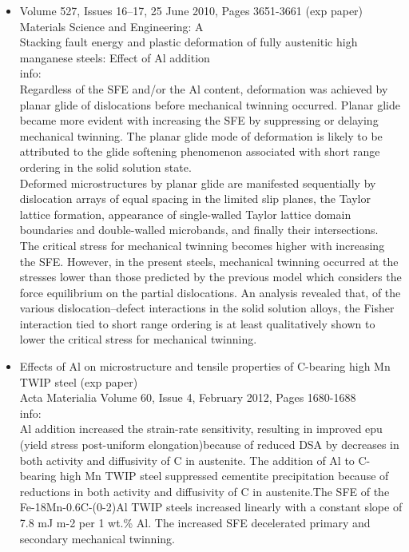 \documentclass[11pt,floatfix,showpacs]{amsart}
\begin{document}
\begin{itemize}
\item 
Volume 527, Issues 16–17, 25 June 2010, Pages 3651-3661 (exp paper)\\
Materials Science and Engineering: A\\
Stacking fault energy and plastic deformation of fully austenitic high manganese steels: Effect of Al addition\\
info:\\
Regardless of the SFE and/or the Al content, deformation was achieved by planar glide of dislocations before mechanical twinning occurred. Planar glide became more evident with increasing the SFE by suppressing or delaying mechanical twinning. The planar glide mode of deformation is likely to be attributed to the glide softening phenomenon associated with short range ordering in the solid solution state.\\

Deformed microstructures by planar glide are manifested sequentially by dislocation arrays of equal spacing in the limited slip planes, the Taylor lattice formation, appearance of single-walled Taylor lattice domain boundaries and double-walled microbands, and finally their intersections.\\


The critical stress for mechanical twinning becomes higher with increasing the SFE. However, in the present steels, mechanical twinning occurred at the stresses lower than those predicted by the previous model which considers the force equilibrium on the partial dislocations. An analysis revealed that, of the various dislocation–defect interactions in the solid solution alloys, the Fisher interaction tied to short range ordering is at least qualitatively shown to lower the critical stress for mechanical twinning.

\item Effects of Al on microstructure and tensile properties of C-bearing high Mn TWIP steel (exp paper)
\\ Acta Materialia
Volume 60, Issue 4, February 2012, Pages 1680-1688\\
info:\\
Al addition increased the strain-rate sensitivity, resulting in improved epu (yield stress post-uniform elongation)because of reduced DSA by decreases in both activity and diffusivity of C in austenite.
The addition of Al to C-bearing high Mn TWIP steel suppressed cementite precipitation because of reductions in both activity and diffusivity of C in austenite.The SFE of the Fe-18Mn-0.6C-(0-2)Al TWIP steels increased linearly with a constant slope of 7.8 mJ m-2 per 1 wt.\% Al. The increased SFE decelerated primary and secondary mechanical twinning.

\end{itemize}
\end{document}
